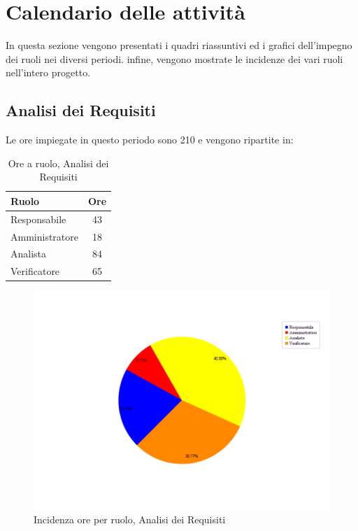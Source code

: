 \section{Calendario delle attività}
In questa sezione vengono presentati i quadri riassuntivi ed i grafici dell'impegno dei ruoli nei diversi periodi. infine, vengono mostrate le incidenze dei vari ruoli nell'intero progetto.
\subsection{Analisi dei Requisiti}
Le ore impiegate in questo periodo sono 210 e vengono ripartite in:
\begin{table}[H]
	\begin{center}
		\begin{tabular}{|l|c|}
			\hline
			\textbf{Ruolo}	& \textbf{Ore} \\
			\hline
			Responsabile	&	43	\\
			\hline
			Amministratore	&	18	\\
			\hline
			Analista		&	84	\\
			\hline
			Verificatore	&	65	\\
			\hline
		\end{tabular}
	\end{center}
	\caption{Ore a ruolo, Analisi dei Requisiti}
\end{table}

\begin{figure}[H]
	\centering
	\includegraphics[scale=0.3]{immagini/Grafi/OreRuoloRR}
	\caption{Incidenza ore per ruolo, Analisi dei Requisiti}
\end{figure}

